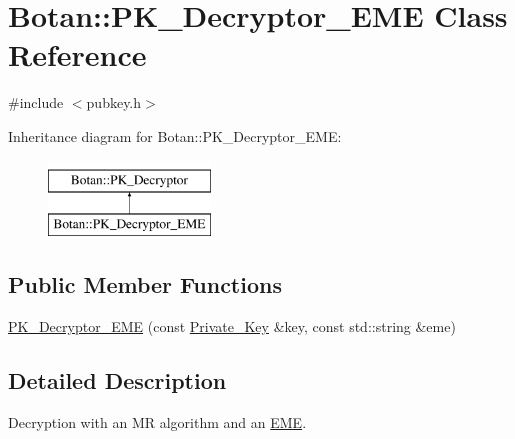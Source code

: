 \hypertarget{classBotan_1_1PK__Decryptor__EME}{\section{Botan\-:\-:P\-K\-\_\-\-Decryptor\-\_\-\-E\-M\-E Class Reference}
\label{classBotan_1_1PK__Decryptor__EME}
}


{\ttfamily \#include $<$pubkey.\-h$>$}

Inheritance diagram for Botan\-:\-:P\-K\-\_\-\-Decryptor\-\_\-\-E\-M\-E\-:\begin{figure}[H]
\begin{center}
\leavevmode
\includegraphics[height=2.000000cm]{classBotan_1_1PK__Decryptor__EME}
\end{center}
\end{figure}
\subsection*{Public Member Functions}
\begin{DoxyCompactItemize}
\item 
\hyperlink{classBotan_1_1PK__Decryptor__EME_a1eb55cb4b8ec7b82ab03653b9181f023}{P\-K\-\_\-\-Decryptor\-\_\-\-E\-M\-E} (const \hyperlink{classBotan_1_1Private__Key}{Private\-\_\-\-Key} \&key, const std\-::string \&eme)
\end{DoxyCompactItemize}


\subsection{Detailed Description}
Decryption with an M\-R algorithm and an \hyperlink{classBotan_1_1EME}{E\-M\-E}. 

